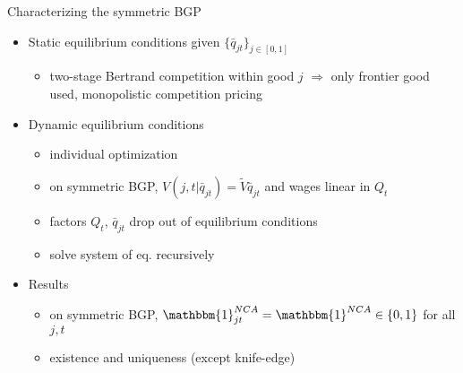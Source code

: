 \documentclass[english,usenames,dvipsnames]{beamer}
\begin{document}
\begin{frame}{Characterizing the symmetric BGP}\label{characterizing_BGP}
	\hyperlink{definition:symmetric_bgp}{}
	\begin{itemize}
		\item Static equilibrium conditions given $\{\bar{q}_{jt}\}_{j \in [0,1]}$ \hyperlink{static_eq_conditions}{}
		\begin{itemize}
			\item two-stage Bertrand competition within good $j$ $\Rightarrow$ only frontier good used, monopolistic competition pricing \hyperlink{two_stage_bertrand}{}
		\end{itemize}
		\medskip
		\item Dynamic equilibrium conditions
		\begin{itemize}
			\item individual optimization \hyperlink{HJB_incumbent}{} \hyperlink{household_optimization}{} 
			\item on symmetric BGP, $V(j,t|\bar{q}_{jt}) = \tilde{V} \bar{q}_{jt}$ and wages linear in $Q_t$  \hyperlink{proposition:hjb_scaling}{} 
			\item factors $Q_t$, $\bar{q}_{jt}$ drop out of equilibrium conditions 
			\item solve system of eq. recursively 
			\hyperlink{eq_innovation_and_growth}{} 
		\end{itemize}
		\medskip
		\item Results 
		\begin{itemize}
			\item on symmetric BGP, $\mathbbm{1}^{NCA}_{jt} = \mathbbm{1}^{NCA} \in \{0,1\}$ for all $j,t$
			\item existence and uniqueness (except knife-edge) \hyperlink{existence_and_uniqueness}{} 
		\end{itemize}
	\end{itemize}
\end{frame}
\end{document}

